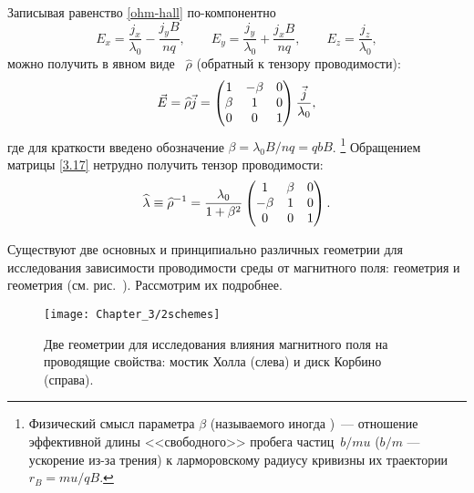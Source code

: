 Записывая равенство \eqref{ohm-hall} по-компонентно
\[
E_x = \frac{j_x}{\lambda_0}  -  \frac{j_y B}{nq} ,\qquad
    E_y = \frac{j_y}{\lambda_0} +  \frac{j_xB}{nq} ,\qquad
    E_z = \frac{j_z}{\lambda_0},
\]
можно получить в явном виде
~$\widehat{\rho}$ (обратный к тензору
проводимости):
\begin{equation}
    \vec{E}=\widehat{\rho}\vec{j}= \left(
    \begin{matrix}
        1 & -\beta & {0} \\
        \beta & 1 & {0} \\
        {0} &{0}& 1
    \end{matrix}
    \right)
    \frac{\vec{j}}{\lambda_0},
    \eqmark{3.17}
\end{equation}
где для краткости введено обозначение $\beta = \lambda_0 B / nq  = q b B$.%
\footnote{Физический смысл параметра $\beta$ (называемого иногда
)~--- отношение
эффективной длины <<свободного>> пробега частиц~$b/mu$
($b/m$ --- ускорение из-за трения) к ларморовскому радиусу кривизны их
траектории $r_B=mu/qB$.}
Обращением матрицы \eqref{3.17} нетрудно получить тензор проводимости:
\begin{equation}
    \widehat{\lambda}\equiv \widehat{\rho}^{-1}=
    \frac{\lambda_0}{1+\beta^2}\left(
    \begin{matrix}
        {1} & \beta & {0} \\
        -\beta & 1 & {0} \\
        {0} &{0}& 1 \\
    \end{matrix}
    \right).
    \eqmark{3.18}
\end{equation}


Существуют две основных и принципиально различных геометрии для исследования
зависимости проводимости среды от магнитного поля: геометрия  и геометрия  (см. рис.~).
Рассмотрим их подробнее.

\begin{figure}[h!]
    \texttt{[image: Chapter\_3/2schemes]}
    \caption{Две геометрии для исследования влияния магнитного поля на
проводящие свойства: мостик Холла (слева) и диск Корбино (справа).}
\end{figure}

